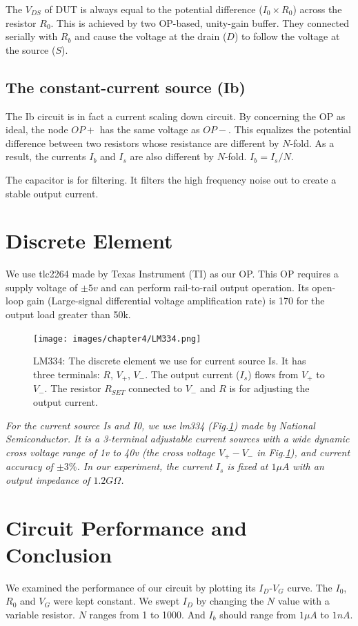 The $V_{DS}$ of DUT is always equal to the potential difference ($I_0 \times R_0$) across the resistor $R_0$.
This is achieved by two OP-based, unity-gain buffer.
They connected serially with $R_b$ and cause the voltage at the drain ($D$) to follow the voltage at the source ($S$).


\subsection*{The  constant-current source (Ib)}
The Ib circuit is in fact a current scaling down circuit.
By concerning the OP as ideal, the node $OP+$ has the same voltage as $OP-$.
This equalizes the potential difference between two resistors whose resistance are different by $N$-fold.
As a result, the currents $I_b$ and $I_s$ are also different by $N$-fold.
$I_b = I_s / N$.

The capacitor is for filtering. It filters the high frequency noise out to create a stable output current.


\section{Discrete Element}
We use tlc2264 made by Texas Instrument (TI) as our OP.
This OP requires a supply voltage of $\pm 5v$ and can perform rail-to-rail output operation.
Its open-loop gain (Large-signal differential voltage amplification rate) is 170 for the output load greater than 50k.

\begin{figure}[tb!hp]
    \centering
    \texttt{[image: images/chapter4/LM334.png]}
    \caption{LM334: The discrete element we use for current source Is. It has three terminals: $R$, $V_+$, $V_-$. The output current ($I_s$) flows from $V_+$ to $V_-$. The resistor $R_{SET}$ connected to $V_-$ and $R$ is for adjusting the output current.}
    \label{fig:lm334}
\end{figure}

\emph{For the current source Is and I0, we use lm334 (Fig.\ref{fig:lm334}) made by National Semiconductor.
It is a 3-terminal adjustable current sources with a wide dynamic cross voltage range of 1v to 40v (the cross voltage $V_{+} - V_{-}$ in Fig.\ref{fig:lm334}), and current accuracy of $\pm 3\%$.
In our experiment, the current $I_s$ is fixed at $1\mu A$ with an output impedance of $1.2G\Omega$.}


\section{Circuit Performance and Conclusion}
We examined the performance of our circuit by plotting its $I_D$-$V_G$ curve.
The $I_0$, $R_0$ and $V_G$ were kept constant.
We swept $I_D$ by changing the $N$ value with a variable resistor.
$N$ ranges from 1 to 1000.
And $I_b$ should range from $1\mu A$ to $1n A$.

